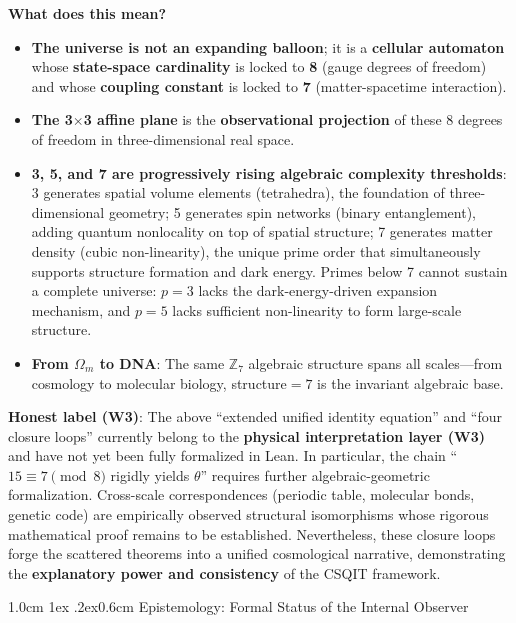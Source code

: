 \documentclass[aps,prd,twocolumn,nofootinbib,floatfix]{revtex4-2}
\makeatletter
\def\section{%
  \@startsection{section}{1}{\z@}
    {1.0cm \@plus1ex \@minus .2ex}{0.6cm}
    {\normalfont\large\bfseries\centering}%
}
\makeatother
\begin{document}
\textbf{What does this mean?}
\begin{itemize}
    \item \textbf{The universe is not an expanding balloon}; it is a \textbf{cellular automaton} whose \textbf{state-space cardinality} is locked to \textbf{8} (gauge degrees of freedom) and whose \textbf{coupling constant} is locked to \textbf{7} (matter-spacetime interaction).
    \item \textbf{The 3$\times$3 affine plane} is the \textbf{observational projection} of these 8 degrees of freedom in three-dimensional real space.
    \item \textbf{3, 5, and 7 are progressively rising algebraic complexity thresholds}: 3 generates spatial volume elements (tetrahedra), the foundation of three-dimensional geometry; 5 generates spin networks (binary entanglement), adding quantum nonlocality on top of spatial structure; 7 generates matter density (cubic non-linearity), the unique prime order that simultaneously supports structure formation and dark energy. Primes below 7 cannot sustain a complete universe: $p=3$ lacks the dark-energy-driven expansion mechanism, and $p=5$ lacks sufficient non-linearity to form large-scale structure.
    \item \textbf{From $\Omega_m$ to DNA}: The same $\mathbb{Z}_7$ algebraic structure spans all scales---from cosmology to molecular biology, structure$=7$ is the invariant algebraic base.
\end{itemize}

\medskip

\noindent\textbf{Honest label (W3)}: The above ``extended unified identity equation'' and ``four closure loops'' currently belong to the \textbf{physical interpretation layer (W3)} and have not yet been fully formalized in Lean. In particular, the chain ``$15 \equiv 7 \pmod 8$ rigidly yields $\theta$'' requires further algebraic-geometric formalization. Cross-scale correspondences (periodic table, molecular bonds, genetic code) are empirically observed structural isomorphisms whose rigorous mathematical proof remains to be established. Nevertheless, these closure loops forge the scattered theorems into a unified cosmological narrative, demonstrating the \textbf{explanatory power and consistency} of the CSQIT framework.

\section{Epistemology: Formal Status of the Internal Observer}
\end{document}
